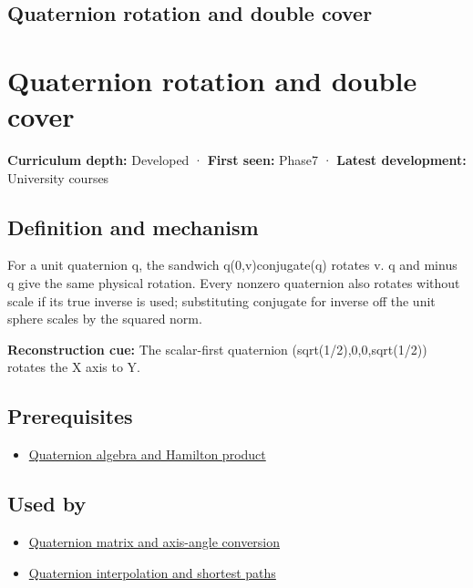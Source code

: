 \hypertarget{appendix-8e61ab68f6b2}{}
\section*{Quaternion rotation and double cover}
\chapter{Quaternion rotation and double cover}\label{appendix-8e61ab68f6b2-quaternion-rotation-and-double-cover}

\textbf{Curriculum depth:} Developed · \textbf{First seen:} Phase7 · \textbf{Latest development:} University courses

\section{Definition and mechanism}\label{appendix-8e61ab68f6b2-definition-and-mechanism}

For a unit quaternion q, the sandwich q(0,v)conjugate(q) rotates v. q and minus q give the same physical rotation. Every nonzero quaternion also rotates without scale if its true inverse is used; substituting conjugate for inverse off the unit sphere scales by the squared norm.

\textbf{Reconstruction cue:} The scalar-first quaternion (sqrt(1/2),0,0,sqrt(1/2)) rotates the X axis to Y.

\section{Prerequisites}\label{appendix-8e61ab68f6b2-prerequisites}

\begin{itemize}
\tightlist
\item
  \hyperref[appendix-965d9260eeab]{Quaternion algebra and Hamilton product}
\end{itemize}

\section{Used by}\label{appendix-8e61ab68f6b2-used-by}

\begin{itemize}
\tightlist
\item
  \hyperref[appendix-26d8da71f6c4]{Quaternion matrix and axis-angle conversion}
\item
  \hyperref[appendix-9b4b8254f26b]{Quaternion interpolation and shortest paths}
\end{itemize}

